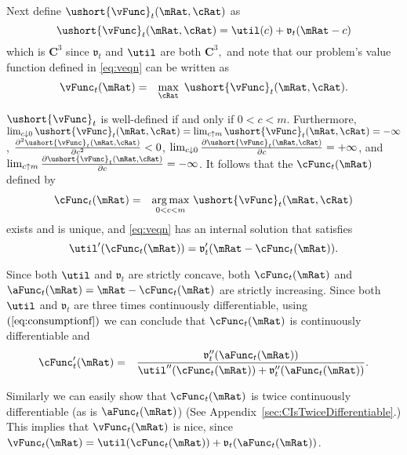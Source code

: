 \documentclass[titlepage]{\econtex}\providecommand{\texname}{BufferStockTheory}
\begin{document}
Next define $\ushort{\vFunc}_{t}(\mRat,\cRat)$ as
\begin{equation}
\ushort{\vFunc}_{t}(\mRat,\cRat)=\util(c)+\mathfrak{v}_{t}(\mRat-c)
\end{equation}
which is $\mathbf{C}^{3}$ since $\mathfrak{v}_{t}$ and $\util$ are both
$\mathbf{C}^{3},$ and note that our problem's value function defined
in \eqref{eq:veqn} can be written as
\begin{eqnarray}
\vFunc_{t}(\mRat) &=& \max_{\cRat}~\ushort{\vFunc}_{t}(\mRat,\cRat).
\end{eqnarray}

$\ushort{\vFunc}_{t}$ is well-defined if and only if $0<c<m$.  Furthermore,
$\lim_{c \downarrow
  0}\ushort{\vFunc}_{t}(\mRat,\cRat)=\lim_{c\uparrow m} \ushort{\vFunc}_{t}(\mRat,\cRat)=-\infty $, $\frac{\partial ^{2}\ushort{\vFunc}_{t}(\mRat,\cRat)}{\partial c^{2}}%
<0$, $\lim_{c \downarrow 0}\frac{\partial \ushort{\vFunc}_{t}(\mRat,\cRat)}{\partial c}%
=+\infty $, and $\lim_{c\uparrow m} \frac{\partial \ushort{\vFunc}_{t}(\mRat,\cRat)}{%
\partial c}=-\infty $. It follows that the $\cFunc_{t}(\mRat)$ defined by
\begin{eqnarray}
\cFunc_{t}(\mRat) & = & \underset{0<c<m}{\arg \max }~\ushort{\vFunc}_{t}(\mRat,\cRat)
\end{eqnarray}
exists and is unique, and \eqref{eq:veqn} has an internal
solution that satisfies
\begin{equation}
\util^{\prime }(\cFunc_{t}(\mRat))=\mathfrak{v}_{t}^{\prime }(\mRat-\cFunc_{t}(\mRat))  \label{eq:consumptionf}.
\end{equation}


Since both $\util$ and $\mathfrak{v}_{t}$ are strictly concave, both
$\cFunc_{t}(\mRat)$ and $\aFunc_{t}(\mRat)=\mRat-\cFunc_{t}(\mRat)$
are strictly increasing. Since both $\util$ and $\mathfrak{v}_{t}$ are
three times continuously differentiable, using $\left(
  \ref{eq:consumptionf}\right) $ we can conclude that
$\cFunc_{t}(\mRat)$ is continuously differentiable and
\begin{eqnarray}
\cFunc_{t}^{\prime }(\mRat) & = & \frac{\mathfrak{v}_{t}^{\prime \prime }({\aFunc}_{t}(\mRat))  }{\util^{\prime \prime }(\cFunc_{t}(\mRat))+\mathfrak{v}_{t}^{\prime \prime }({\aFunc}_{t}(\mRat))}.
\end{eqnarray}

Similarly we can easily show that $\cFunc_{t}(\mRat)$ is twice
continuously differentiable (as is $\aFunc_{t}(\mRat)$) (See
Appendix~\ref{sec:CIsTwiceDifferentiable}.)  This implies that
$\vFunc_{t}(\mRat)$ is nice, since
$\vFunc_{t}(\mRat)=\util(\cFunc_{t}(\mRat))+\mathfrak{v}_{t}({\aFunc}_{t}(\mRat))$.
\end{document}
